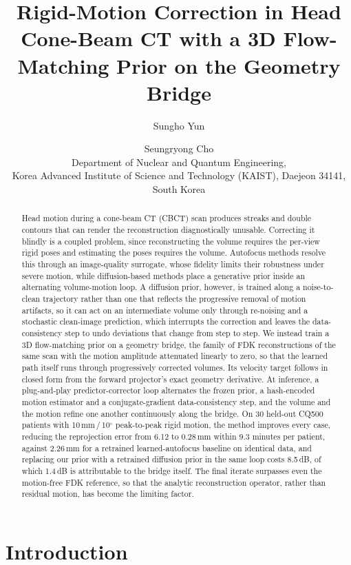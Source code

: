 \documentclass[11pt]{article}
\title{\bfseries Rigid-Motion Correction in Head Cone-Beam CT with a 3D Flow-Matching
Prior on the Geometry Bridge}
\author{%
Sungho Yun \and Seungryong Cho\\[2pt]
{\normalsize Department of Nuclear and Quantum Engineering,}\\
{\normalsize Korea Advanced Institute of Science and Technology (KAIST), Daejeon 34141, South Korea}}
\date{}
\begin{document}
\maketitle

\begin{abstract}
\noindent
Head motion during a cone-beam CT (CBCT) scan produces streaks and double contours that
can render the reconstruction diagnostically unusable. Correcting it blindly is a coupled
problem, since reconstructing the volume requires the per-view rigid poses and estimating
the poses requires the volume. Autofocus methods resolve this through an image-quality
surrogate, whose fidelity limits their robustness under severe motion, while
diffusion-based methods place a generative prior inside an alternating volume-motion loop.
A diffusion prior, however, is trained along a noise-to-clean trajectory rather than one
that reflects the progressive removal of motion artifacts, so it can act on an
intermediate volume only through re-noising and a stochastic clean-image prediction, which
interrupts the correction and leaves the data-consistency step to undo deviations that
change from step to step. We
instead train a 3D flow-matching prior on a geometry bridge, the family of FDK
reconstructions of the same scan with the motion amplitude attenuated linearly to zero,
so that the learned path itself runs through progressively corrected volumes. Its
velocity target follows in closed form from the forward projector's exact geometry
derivative. At inference, a plug-and-play predictor-corrector loop alternates the frozen
prior, a hash-encoded motion estimator and a conjugate-gradient data-consistency step, and
the volume and the motion refine one another continuously along the bridge. On 30
held-out CQ500 patients with 10\,mm\,/\,10$^\circ$ peak-to-peak rigid motion, the method
improves every case, reducing the reprojection error from 6.12 to 0.28\,mm within 9.3
minutes per patient, against 2.26\,mm for a retrained learned-autofocus baseline on
identical data, and replacing our prior with a retrained diffusion prior in the same
loop costs 8.5\,dB, of which 1.4\,dB is attributable to the bridge itself. The final
iterate surpasses even the motion-free FDK reference, so that the analytic reconstruction
operator, rather than residual motion, has become the limiting factor.
\end{abstract}

\section{Introduction}
\label{sec:intro}
\end{document}
